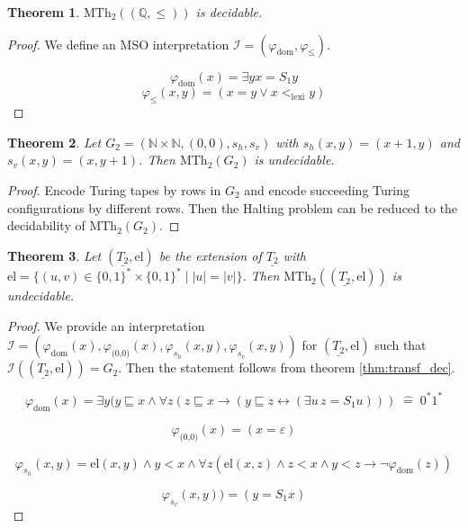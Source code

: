 \documentclass{article}
\newtheorem{theorem}{Theorem}
\begin{document}
\begin{theorem}
	$\text{MTh}_2((\mathbb{Q}, \leq))$ is decidable.
\end{theorem}
\begin{proof}
	We define an MSO interpretation $\mathcal{I} = (\varphi_\text{dom}, \varphi_\leq)$.
	
	$$ \varphi_\text{dom}(x) = \exists y x = S_1 y $$
	$$ \varphi_\leq(x, y) = (x = y \lor x <_\text{lexi} y) $$
\end{proof}

\begin{theorem}
	Let $G_2 = (\mathbb{N} \times \mathbb{N}, (0, 0), s_h, s_v)$ with $s_h(x, y) = (x+1, y)$ and $s_v(x, y) = (x, y+1)$. Then $\text{MTh}_2(G_2)$ is undecidable.
\end{theorem}
\begin{proof}
	Encode Turing tapes by rows in $G_2$ and encode succeeding Turing configurations by different rows. Then the Halting problem can be reduced to the decidability of $\text{MTh}_2(G_2)$.
\end{proof}

\begin{theorem}
	Let $(\underline{T_2}, \text{el})$ be the extension of $\underline{T_2}$ with $\text{el} = \{(u, v) \in \{0,1\}^* \times \{0,1\}^* \mid |u| = |v|\}$. Then $\text{MTh}_2((\underline{T_2}, \text{el}))$ is undecidable.
\end{theorem}
\begin{proof}
	We provide an interpretation $\mathcal{I} = (\varphi_\text{dom}(x), \varphi_\text{(0,0)}(x), \varphi_{s_h}(x, y), \varphi_{s_v}(x, y))$ for $(\underline{T_2}, \text{el})$ such that $\mathcal{I}((\underline{T_2}, \text{el})) = G_2$. Then the statement follows from theorem \ref{thm:transf_dec}.
	
	$$\varphi_\text{dom}(x) = \exists y (y \sqsubseteq x \land \forall z (z \sqsubseteq x \rightarrow (y \sqsubseteq z \leftrightarrow (\exists u \, z = S_1 u))) \;\hat{=}\; 0^*1^*$$
	
	$$\varphi_\text{(0,0)}(x) = (x = \varepsilon)$$
	
	$$\varphi_{s_h}(x, y) = \text{el}(x, y) \land y < x \land \forall z (\text{el}(x, z) \land z < x \land y < z \rightarrow \neg \varphi_\text{dom}(z)) $$
	
	$$\varphi_{s_v}(x, y)) = (y = S_1 x)$$
\end{proof}
\end{document}
